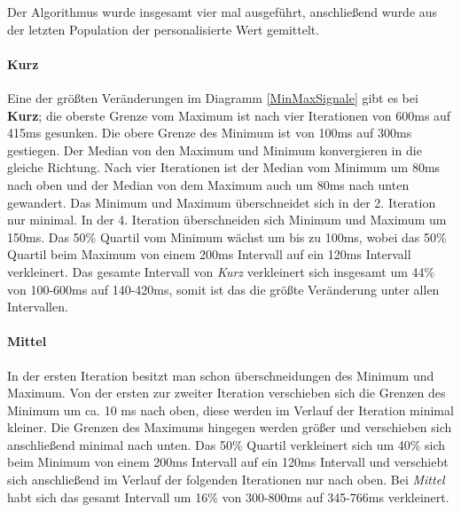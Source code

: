 Der Algorithmus wurde insgesamt vier mal ausgef{\"u}hrt, anschlie{\ss}end wurde aus der letzten Population der personalisierte Wert gemittelt. 

\paragraph{Kurz}
Eine der gr{\"o}{\ss}ten Ver{\"a}nderungen im Diagramm \autoref{MinMaxSignale} gibt es bei \textbf{Kurz}; die oberste Grenze vom Maximum ist nach vier Iterationen von 600ms auf 415ms gesunken. 
Die obere Grenze des Minimum ist von 100ms auf 300ms gestiegen. 
Der Median von den Maximum und Minimum konvergieren in die gleiche Richtung. 
Nach vier Iterationen ist der Median vom Minimum um 80ms nach oben und der Median von dem Maximum auch um 80ms nach unten gewandert. 
Das Minimum und Maximum {\"u}berschneidet sich in der 2. Iteration nur minimal. 
In der 4. Iteration {\"u}berschneiden sich Minimum und Maximum um 150ms. 
Das 50\% Quartil vom Minimum wächst um bis zu 100ms, wobei das 50\% Quartil beim Maximum von einem 200ms Intervall auf ein 120ms Intervall verkleinert. 
Das gesamte Intervall von \textit{Kurz} verkleinert sich insgesamt um 44\% von 100-600ms auf 140-420ms, somit ist das die größte Veränderung unter allen Intervallen.



\paragraph{Mittel}
In der ersten Iteration besitzt man schon {\"u}berschneidungen des Minimum und Maximum. 
Von der ersten zur zweiter Iteration verschieben sich die Grenzen des Minimum um ca. 10 ms nach oben, diese werden im Verlauf der Iteration minimal kleiner.  
Die Grenzen des Maximums hingegen werden gr{\"o}{\ss}er und verschieben sich anschlie{\ss}end minimal nach unten. 
Das 50\% Quartil verkleinert sich um 40\% sich beim Minimum von einem 200ms Intervall auf ein 120ms Intervall und verschiebt sich anschlie{\ss}end im Verlauf der folgenden Iterationen nur nach oben. 
Bei \textit{Mittel} habt sich das gesamt Intervall um 16\% von 300-800ms auf 345-766ms verkleinert.


